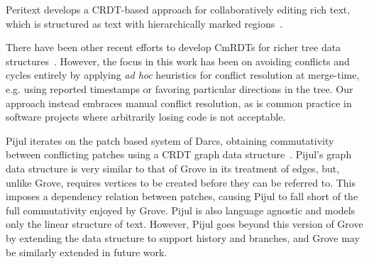 Peritext develops a CRDT-based approach for collaboratively editing rich text, which is structured as text with hierarchically marked regions~\cite{DBLP:journals/pacmhci/LittLKH22}. 

There have been other recent efforts to develop CmRDTs for richer tree data structures~\cite{DBLP:conf/icdcs/PreguicaMSL09, Highly-Available}. However, the focus in this work has been on avoiding conflicts and cycles entirely by applying \emph{ad hoc} heuristics for conflict resolution at merge-time, e.g. using reported timestamps or favoring particular directions in the tree. Our approach instead embraces manual conflict resolution, as is common practice in software projects where arbitrarily losing code is not acceptable. 


Pijul iterates on the patch based system of Darcs, obtaining commutativity between conflicting patches using a CRDT graph data structure~\cite{pijul-talk}. Pijul's graph data structure is very similar to that of Grove in its treatment of edges, but, unlike Grove, requires vertices to be created before they can be referred to. This imposes a dependency relation between patches, causing Pijul to fall short of the full commutativity enjoyed by Grove.
Pijul is also language agnostic and models only the linear structure of text. However, Pijul goes beyond this version of Grove by extending the data structure to support history and branches, and Grove may be similarly extended in future work.










